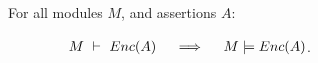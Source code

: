  
  \begin{lemma}
\label{lem:encap-soundness}
For all modules $M$, and assertions $A$: 

$\strut \hspace{1.5cm} \proves{M}{\encaps{A}} \ \ \ \ \Longrightarrow\ \ \ \ \satisfies{M}{\encaps{A}}$.
\end{lemma}

